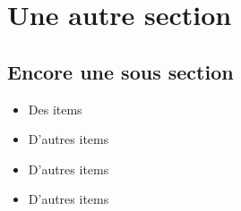 
\section{Une autre section}

\subsection{Encore une sous section}

\begin{itemize}
    \item Des items
    \item D'autres items
    \item D'autres items
    \item D'autres items
\end{itemize}


\newpage